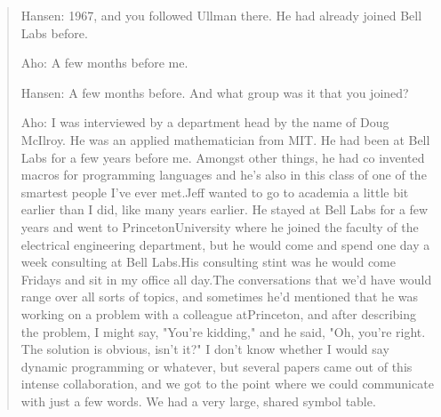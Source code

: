 \begin{quotation}
Hansen: 1967, and you followed Ullman there. He had already joined Bell Labs before.

Aho: A few months before me.

Hansen: A few months before. And what group was it that you joined?

Aho: I was interviewed by a department head by the name of Doug McIlroy. He was an 
applied mathematician from MIT. He had been at Bell Labs for a few years before me. Amongst other 
things, he had co invented macros for programming languages and he's also in this class of one of the 
smartest people I've ever met.Jeff wanted to go to academia a little bit earlier than I did, like 
many years earlier. He stayed at Bell Labs for a few years and went to PrincetonUniversity where he 
joined the faculty of the electrical engineering department, but he would come and spend one day a 
week consulting at Bell Labs.His consulting stint was he would come Fridays and sit in my office 
all day.The conversations that we'd have would range over all sorts of topics, and sometimes he'd 
mentioned that he was working on a problem with a colleague atPrinceton, and after describing the 
problem, I might say, "You're kidding," and he said, "Oh, you're right. The solution is obvious, 
isn't it?" I don't know whether I would say dynamic programming or whatever, but several papers 
came out of this intense collaboration, and we got to the point where we could communicate with just 
a few words. We had a very large, shared symbol table.
\cite{aho_oral_history_2022}
\end{quotation}
